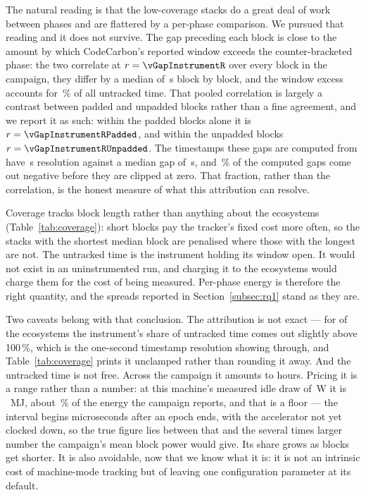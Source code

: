 The natural reading is that the low-coverage stacks do a great deal of work
between phases and are flattered by a per-phase comparison. We pursued that
reading and it does not survive. The gap preceding each block is close to the
amount by which CodeCarbon's reported window exceeds the counter-bracketed
phase: the two correlate at $r = \vGapInstrumentR$ over every block in the
campaign, they differ by a median of \vGapVsExcessS\,\si{\second} block by block, and the
window excess accounts for \vGapInstrumentPct\,\% of all untracked time. That pooled
correlation is largely a contrast between padded and unpadded blocks rather than
a fine agreement, and we report it as such: within the padded blocks alone it is
$r = \vGapInstrumentRPadded$, and within the unpadded blocks
$r = \vGapInstrumentRUnpadded$. The timestamps these gaps are computed from have
\vGapTimestampResolutionS\,\si{\second} resolution against a median gap of
\vGapMedianS\,\si{\second}, and \vGapNegativePct\,\% of the computed gaps come
out negative before they are clipped at zero. That fraction, rather than the
correlation, is the honest measure of what this attribution can resolve.

Coverage tracks block length rather than anything about the ecosystems
(Table~\ref{tab:coverage}): short blocks pay the tracker's fixed cost more often, so the stacks with the
shortest median block are penalised where those with the longest are not. The
untracked time is the instrument holding its window open. It would not exist in
an uninstrumented run, and charging it to the ecosystems would charge them for
the cost of being measured. Per-phase energy is therefore the right quantity,
and the spreads reported in Section~\ref{subsec:rq1} stand as they are.

Two caveats belong with that conclusion. The attribution is not exact --- for
\vCoverageOverAttributedEcos{} of the \vEcosystems{} ecosystems the instrument's
share of untracked time comes out slightly above 100\,\%, which is the
one-second timestamp resolution showing through, and
Table~\ref{tab:coverage} prints it unclamped rather than rounding it away. And the untracked time is not free. Across the campaign it amounts to
\vUntrackedHours{} hours. Pricing it is a range rather than a number: at this
machine's measured idle draw of \vIdleTotalW\,\si{\watt} it is
\vUntrackedMJ~MJ, about \vUntrackedPct\,\% of the energy the campaign reports,
and that is a floor --- the interval begins microseconds after an epoch ends,
with the accelerator not yet clocked down, so the true figure lies between that
and the several times larger number the campaign's mean block power would give.
Its share grows as blocks get shorter. It is also avoidable, now that we know
what it is: it is not an intrinsic cost of machine-mode tracking but of leaving
one configuration parameter at its default.

